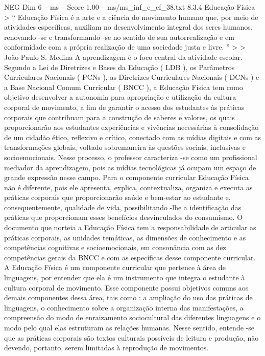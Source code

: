 \begin{textsample}{NEG Dim 6 – ms – Score 1.00 – ms/ms\_inf\_e\_ef\_38.txt}  \label{ex:f6_neg_231}
8.3.4 Educação Física > “ Educação Física é a arte e a ciência do movimento humano que, por meio de atividades específicas, auxiliam no desenvolvimento integral dos seres humanos, renovando -se e transformando -se no sentido de sua autorrealização e em conformidade com a própria realização de uma sociedade justa e livre. ” > > João Paulo S.
Medina A aprendizagem é o foco central da atividade escolar.
Segundo a Lei de Diretrizes e Bases da Educação ( LDB ), os Parâmetros Curriculares Nacionais ( PCNs ), as Diretrizes Curriculares Nacionais ( DCNs ) e a Base Nacional Comum Curricular ( BNCC ), a Educação Física tem como objetivo desenvolver a autonomia para apropriação e utilização da cultura corporal de movimento, a fim de garantir o acesso dos estudantes às práticas corporais que contribuam para a construção de saberes e valores, os quais proporcionarão aos estudantes experiências e vivências necessárias à consolidação de um cidadão ético, reflexivo e crítico, conectado com as mídias digitais e com as transformações globais, voltado sobremaneira às questões sociais, inclusivas e socioemocionais.
Nesse processo, o professor caracteriza -se como um profissional mediador da aprendizagem, pois as mídias tecnológicas já ocupam um espaço de grande expressão nesse campo.
Para o componente curricular Educação Física não é diferente, pois ele apresenta, explica, contextualiza, organiza e executa as práticas corporais que proporcionarão saúde e bem-estar ao estudante e, consequentemente, qualidade de vida, possibilitando -lhe a identificação das práticas que proporcionam esses benefícios desvinculados do consumismo.
O documento que norteia a Educação Física tem a responsabilidade de articular as práticas corporais, as unidades temáticas, as dimensões de conhecimento e as competências cognitivas e socioemocionais, em consonância com as dez competências gerais da BNCC e com as específicas desse componente curricular.
A Educação Física é um componente curricular que pertence à área de linguagens, por entender que ela é um instrumento que integra o estudante à cultura corporal de movimento.
Esse componente possui objetivos comuns aos demais componentes dessa área, tais como : a ampliação do uso das práticas de linguagens, o conhecimento sobre a organização interna das manifestações, a compreensão do modo de enraizamento sociocultural das diferentes linguagens e o modo pelo qual elas estruturam as relações humanas.
Nesse sentido, entende -se que as práticas corporais são textos culturais possíveis de leitura e produção, não devendo, portanto, serem limitadas à reprodução de movimentos.

\end{textsample}

